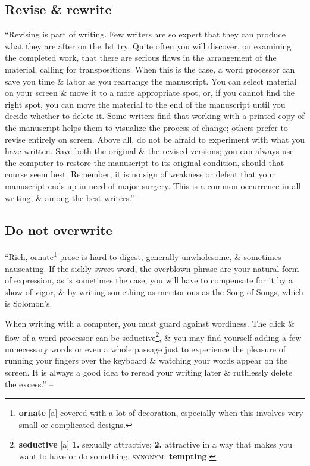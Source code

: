 \documentclass[oneside]{book}
\numberwithin{equation}{section}
\begin{document}
\subsection{Revise \& rewrite}
``Revising is part of writing. Few writers are so expert that they can produce what they are after on the 1st try. Quite often you will discover, on examining the completed work, that there are serious flaws in the arrangement of the material, calling for transpositions. When this is the case, a word processor can save you time \& labor as you rearrange the manuscript. You can select material on your screen \& move it to  a more appropriate spot, or, if you cannot find the right spot, you can move the material to the end of the manuscript until you decide whether to delete it. Some writers find that working with a printed copy of the manuscript helps them to visualize the process of change; others prefer to revise entirely on screen. Above all, do not be afraid to experiment with what you have written. Save both the original \& the revised versions; you can always use the computer to restore the manuscript to its original condition, should that course seem best. Remember, it is no sign of weakness or defeat that your manuscript ends up in need of major surgery. This is a common occurrence in all writing, \& among the best writers.'' -- \cite[Chap. 5, Sect. 5, p. 82]{Strunk_White2019}

\subsection{Do not overwrite}
``Rich, ornate\footnote{\textbf{ornate} [a] covered with a lot of decoration, especially when this involves very small or complicated designs.} prose is hard to digest, generally unwholesome, \& sometimes nauseating. If the sickly-sweet word, the overblown phrase are your natural form of expression, as is sometimes the case, you will have to compensate for it by a show of vigor, \& by writing something as meritorious as the Song of Songs, which is Solomon's.

When writing with a computer, you must guard against wordiness. The click \& flow of a word processor can be seductive\footnote{\textbf{seductive} [a] \textbf{1.} sexually attractive; \textbf{2.} attractive in a way that makes you want to have or do something, \textsc{synonym}: \textbf{tempting}.}, \& you may find yourself adding a few unnecessary words or even a whole passage just to experience the pleasure of running your fingers over the keyboard \& watching your words appear on the screen. It is always a good idea to reread your writing later \& ruthlessly delete the excess.'' -- \cite[Chap. 5, Sect. 6, p. 83]{Strunk_White2019}
\end{document}
